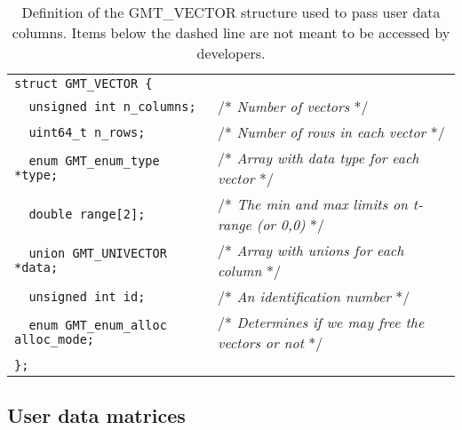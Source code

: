 \documentclass[11pt]{report}
\begin{document}
\begin{table}[h]
\small
\centering
\begin{tabular}{ll} \hline
\verb!struct GMT_VECTOR {!               & \\
\verb!  unsigned int n_columns;!         & /* \emph{Number of vectors} */\\
\verb!  uint64_t n_rows;!                & /* \emph{Number of rows in each vector} */ \\
\verb!  enum GMT_enum_type *type;!       & /* \emph{Array with data type for each vector} */\\
\verb!  double range[2];!                & /* \emph{The min and max limits on t-range (or 0,0) } */\\
\verb!  union GMT_UNIVECTOR *data;!      & /* \emph{Array with unions for each column} */\\ \hdashline
\verb!  unsigned int id;!                & /* \emph{An identification number} */ \\
\verb!  enum GMT_enum_alloc alloc_mode;! & /* \emph{Determines if we may free the vectors or not} */\\
\verb!};!                                & \\
\hline
\end{tabular}
\caption{Definition of the GMT\_VECTOR structure used to pass user data columns.  Items below the dashed
line are not meant to be accessed by developers.}
\label{tbl:vector}
\end{table}
\noindent

\subsection{User data matrices}
\end{document}
